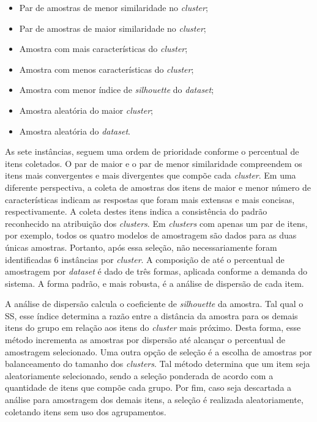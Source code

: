 \begin{itemize}
	\item Par de amostras de menor similaridade no \textit{cluster};
	\item Par de amostras de maior similaridade no \textit{cluster};
	\item Amostra com mais características do \textit{cluster};
	\item Amostra com menos características do \textit{cluster};
	\item Amostra com menor índice de \textit{silhouette} do \textit{dataset};
	\item Amostra aleatória do maior \textit{cluster};
	\item Amostra aleatória do \textit{dataset}.
\end{itemize}

As sete instâncias, seguem uma ordem de prioridade conforme o percentual de itens coletados. O par de maior e o par de menor similaridade compreendem os itens mais convergentes e mais divergentes que compõe cada \textit{cluster}. Em uma diferente perspectiva, a coleta de amostras dos itens de maior e menor número de características indicam as respostas que foram mais extensas e mais concisas, respectivamente. A coleta destes itens indica a consistência do padrão reconhecido na atribuição dos \textit{clusters}. Em \textit{clusters} com apenas um par de itens, por exemplo, todos os quatro modelos de amostragem são dados para as duas únicas amostras. Portanto, após essa seleção, não necessariamente foram identificadas 6 instâncias por \textit{cluster}. A composição de até o percentual de amostragem por \textit{dataset} é dado de três formas, aplicada conforme a demanda do sistema. A forma padrão, e mais robusta, é a análise de dispersão de cada item.

A análise de dispersão calcula o coeficiente de \textit{silhouette} da amostra. Tal qual o SS, esse índice determina a razão entre a distância da amostra para os demais itens do grupo em relação aos itens do \textit{cluster} mais próximo. Desta forma, esse método incrementa as amostras por dispersão até alcançar o percentual de amostragem selecionado. Uma outra opção de seleção é a escolha de amostras por balanceamento do tamanho dos \textit{clusters}. Tal método determina que um item seja aleatoriamente selecionado, sendo a seleção ponderada de acordo com a quantidade de itens que compõe cada grupo. Por fim, caso seja descartada a análise para amostragem dos demais itens, a seleção é realizada aleatoriamente, coletando itens sem uso dos agrupamentos.

